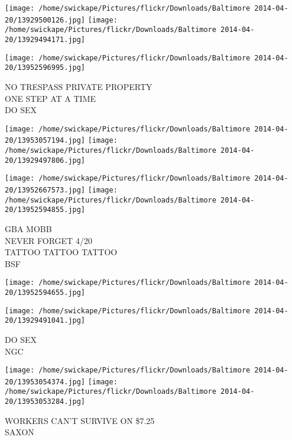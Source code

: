 \documentclass[10pt,letterpaper]{article}
\begin{document}
\texttt{[image: /home/swickape/Pictures/flickr/Downloads/Baltimore 2014-04-20/13929500126.jpg]}
\texttt{[image: /home/swickape/Pictures/flickr/Downloads/Baltimore 2014-04-20/13929494171.jpg]}

\vspace{0.25in}
\texttt{[image: /home/swickape/Pictures/flickr/Downloads/Baltimore 2014-04-20/13952596995.jpg]}

NO TRESPASS PRIVATE PROPERTY\\
ONE STEP AT A TIME\\
DO SEX\\
\pagebreak

\texttt{[image: /home/swickape/Pictures/flickr/Downloads/Baltimore 2014-04-20/13953057194.jpg]}
\texttt{[image: /home/swickape/Pictures/flickr/Downloads/Baltimore 2014-04-20/13929497806.jpg]}

\texttt{[image: /home/swickape/Pictures/flickr/Downloads/Baltimore 2014-04-20/13952667573.jpg]}
\texttt{[image: /home/swickape/Pictures/flickr/Downloads/Baltimore 2014-04-20/13952594855.jpg]}

GBA MOBB\\
NEVER FORGET 4/20\\
TATTOO TATTOO TATTOO\\
BSF\\
\pagebreak

\texttt{[image: /home/swickape/Pictures/flickr/Downloads/Baltimore 2014-04-20/13952594655.jpg]}

\vspace{0.25in}
\texttt{[image: /home/swickape/Pictures/flickr/Downloads/Baltimore 2014-04-20/13929491041.jpg]}

DO SEX\\
NGC\\
\pagebreak

\texttt{[image: /home/swickape/Pictures/flickr/Downloads/Baltimore 2014-04-20/13953054374.jpg]}
\texttt{[image: /home/swickape/Pictures/flickr/Downloads/Baltimore 2014-04-20/13953053284.jpg]}

WORKERS CAN'T SURVIVE ON \$7.25\\
SAXON\\
\pagebreak
\end{document}
